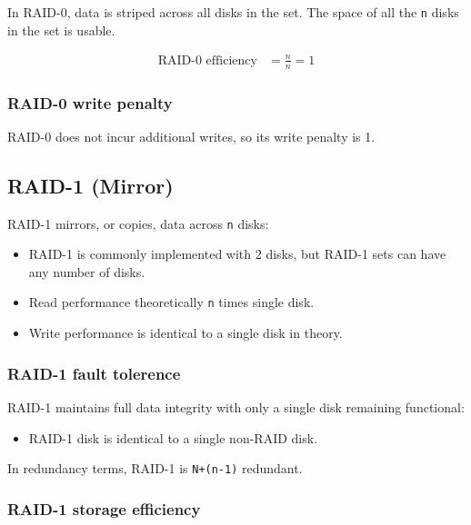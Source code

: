 In RAID-0, data is striped across all disks in the set. The space of all
the \texttt{n} disks in the set is usable.

\begin{align}
  \mbox{RAID-0 efficiency} & = \frac{n}{n} = 1 \label{eq:raid-0-storage-efficiency}
\end{align}

\subsubsection{RAID-0 write penalty}
\label{sec:raid-0-write-penalty}

RAID-0 does not incur additional writes, so its write penalty is 1.

\subsection{RAID-1 (Mirror)}
\label{sec:raid-1}

RAID-1 mirrors, or copies, data across \texttt{n} disks:


\begin{itemize}
\item
  RAID-1 is commonly implemented with 2 disks, but RAID-1 sets can have
  any number of disks.
\item
  Read performance theoretically \texttt{n} times single disk.
\item
  Write performance is identical to a single disk in theory.
\end{itemize}

\subsubsection{RAID-1 fault tolerence}
\label{sec:raid-1-fault-tolerence}

RAID-1 maintains full data integrity with only a single disk remaining
functional:

\begin{itemize}

\item
  RAID-1 disk is identical to a single non-RAID disk.
\end{itemize}

In redundancy terms, RAID-1 is \texttt{N+(n-1)} redundant.

\subsubsection{RAID-1 storage efficiency}
\label{sec:raid-1-storage-efficiency}

